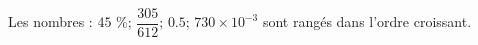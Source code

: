 \begin{exercice*}
    Les nombres : $45$ \%; $\dfrac{305}{612}$; $\num{0.5}$; $730\times 10^{-3}$ sont rangés dans l'ordre croissant.
\end{exercice*}
 

